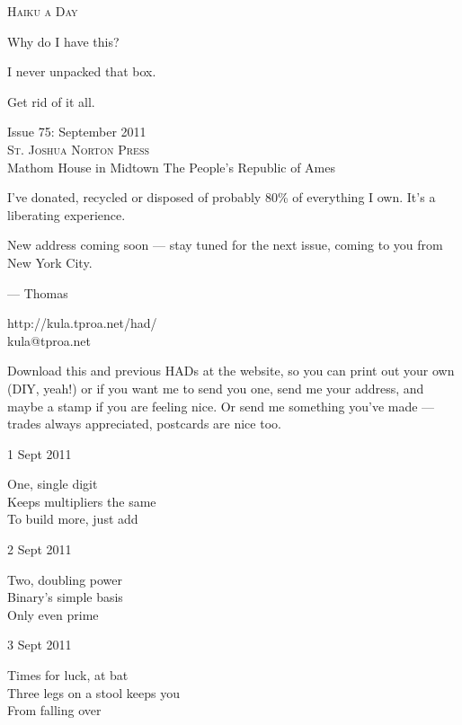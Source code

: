 \documentclass[12pt]{article}
\begin{document}
\begin{center}
{\fontsize{36}{48}\selectfont \textsc{Haiku a Day }}
\end{center}

\vspace*{3.5cm}

{\fontsize{20}{40}\selectfont 

Why do I have this?

I never unpacked that box.

Get rid of it all.


}

\vspace*{5.0cm}
\begin{center}
{\large{Issue 75: September 2011}} \\[5mm]
{\fontsize{8}{8}\selectfont  \textsc{ St. Joshua Norton Press }} \\[1mm]
{\fontsize{6}{6}\selectfont Mathom House in Midtown \textbar The People's Republic of Ames }
\end{center}


\newpage

I've donated, recycled or disposed of probably 80\% of everything I own.
It's a liberating experience.

New address coming soon --- stay tuned for the next issue, coming
to you from New York City.

--- Thomas

http://kula.tproa.net/had/ \\
kula@tproa.net

Download this and previous HADs at the website, so you can
print out your own (DIY, yeah!) or if you want me to send
you one, send me your address, and maybe a stamp if you
are feeling nice. Or send me something you've made ---
trades always appreciated, postcards are nice too.

\vfill

1 Sept 2011

One, single digit \\
Keeps multipliers the same \\
To build more, just add

2 Sept 2011

Two, doubling power \\
Binary's simple basis \\
Only even prime

\newpage

3 Sept 2011

Times for luck, at bat \\
Three legs on a stool keeps you \\
From falling over
\end{document}
